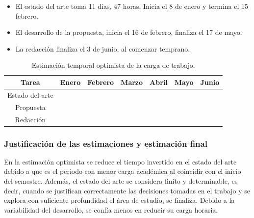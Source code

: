 \begin{itemize}
	\item El estado del arte toma 11 días, 47 horas. Inicia el 8 de enero y termina el 15 febrero.
	\item El desarrollo de la propuesta, inicia el 16 de febrero, finaliza el 17 de mayo. 
	\item La redacción finaliza el 3 de junio, al comenzar temprano.
\end{itemize}
\begin{center}
	\begin{table}[h]
		\centering
		\caption{Estimación temporal optimista de la carga de trabajo.}
		\label{table:EstimacionOptimista}
		\begin{adjustbox}{max width=\textwidth}
			\begin{NiceTabular}{ |>{\centering\arraybackslash}c|>{\centering\arraybackslash}c|>{\centering\arraybackslash}c|>{\centering\arraybackslash}c|>{\centering\arraybackslash}c|>{\centering\arraybackslash}c|>{\centering\arraybackslash}c| }
				\midrule
				\textbf{Tarea} & Enero & Febrero & Marzo & Abril & Mayo & Junio \\	
				\midrule
				Estado del arte & \cellcolor{blue} &   &  &  &  &  \\
				\midrule
				Propuesta & & & \cellcolor{red} &  &  &  \\
				\midrule
				Redacción & \cellcolor{yellow} &   &  &  &  &  \\
				\midrule
			\end{NiceTabular}
		\end{adjustbox}
	\end{table}
\end{center}
\subsubsection{Justificación de las estimaciones y estimación final}
En la estimación optimista se reduce el tiempo invertido en el estado del arte debido a que es el periodo con menor carga académica al coincidir con el inicio del semestre. Además, el estado del arte se considera finito y determinable, es decir, cuando se justifican correctamente las decisiones tomadas en el trabajo y se explora con suficiente profundidad el área de estudio, se finaliza. Debido a la variabilidad del desarrollo, se confía menos en reducir su carga horaria. \\

